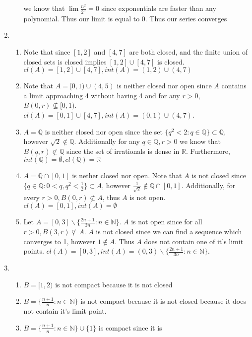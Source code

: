 \documentclass[12pt, letterpaper]{article}
\newcommand{\N}{\mathbb{N}}
\newcommand{\R}{\mathbb{R}}
\newcommand{\Q}{\mathbb{Q}}
\begin{document}
\begin{enumerate}
\begin{enumerate}
		we know that $\lim \frac{n^2}{2^n} = 0$ since exponentials are faster than
		any polynomial.  Thus our limit is equal to 0.  Thus our series converges 
	\end{enumerate}
	\item 
	\begin{enumerate}
		\item Note that since $[1,2]$ and $[4,7]$ are both closed, and the finite
		union of closed sets is closed implies $[1,2] \cup [4,7]$ is closed.
		$cl(A) = [1,2] \cup [4,7], int(A) = (1,2) \cup (4,7)$
		\item Note that $A = [0,1) \cup (4,5)$ is neither closed nor open since 
		$A$ contains a limit approaching 4 without having 4 and for any $r > 0$,
		$B(0,r) \not \subseteq [0,1)$.\\
		$cl(A) = [0,1] \cup [4,7], int(A) = (0,1) \cup (4,7)$.  
		\item $A = \Q$ is neither closed nor open since 
		the set $\{q^2 < 2: q \in \Q\} \subset \Q$, 
		however $\sqrt{2} \not \in \Q$.
		Additionally for any $q \in \Q, r > 0$ 
		we know that $B(q,r) \not \subset \Q$ since the set of irrationals is 
		dense in $\R$.  Furthermore, $int(\Q)  = \emptyset, cl(\Q) =\R$
		\item $A = \Q \cap [0,1]$ is nether closed nor open.  Note that $A$ 
		is not closed since\\ $\{q \in \Q : 0< q, q^2 < \frac{1}{2}\} \subset A$,
		however $\frac{1}{\sqrt{2}} \not \in \Q \cap [0,1]$.  Additionally, 
		for every $r > 0, B(0,r) \not \subset A$, thus $A$ is not open.  
		$cl(A) = [0,1], int(A) = \emptyset$
		\item Let $A = [0,3]\backslash \{\frac{2n+1}{3n} : n \in \N\}$.  
		$A$ is not open since for all $r > 0, B(3,r) \not \subseteq A$.  $A$ is 
		not closed since we can find a sequence which converges to 1, however 
		$1 \not \in A$.  Thus $A$ does not contain one of it's limit points.  
		$cl(A) = [0,3], int(A) = (0,3)\backslash \{\frac{2n+1}{3n} : n \in \N\}$.
	\end{enumerate}
	\item
	\begin{enumerate}
		\item  $B = [1,2)$ is not compact because it is not closed
		\item $B = \{\frac{n+1}{n} : n \in \N\}$ is not compact because it is not
		closed because it does not contain it's limit point. 
		\item $B = \{\frac{n+1}{n} : n \in \N\} \cup \{1\}$ is compact since it is 

\end{enumerate}
\end{enumerate}
\end{document}

